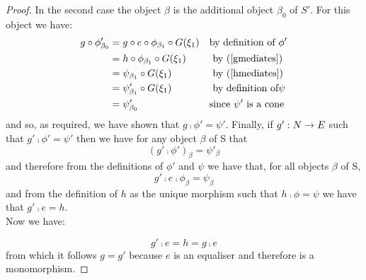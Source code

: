 \documentclass[10pt,a4paper]{scrartcl}
\begin{document}
\begin{proof}
\noindent
In the second case the object $\beta$ is the additional object $\beta_0$ of $S'$. For this object we have:
\begin{align*}
g \circ \phi'_{\beta_0}
   & = g \circ e \circ \phi_{\beta_1} \circ G(\xi_1)  && \mbox{by definition of }\phi' \\ 
             & = h \circ \phi_{\beta_1} \circ G(\xi_1) && \mbox{ by (\ref{gmediates})} \\
             & = \psi_{\beta_1}  \circ G(\xi_1)       && \mbox{ by (\ref{hmediates})} \\
						 & = \psi'_{\beta_1} \circ G(\xi_1)       && \mbox{ by definition of} \psi \\
						& = \psi'_{\beta_0}                        && \mbox{since }\psi' \mbox{ is a cone} \\ 
\end{align*}
and so, as required, we have shown that 
$g \comp \phi' = \psi'$.
\noindent Finally, if $g':N \rightarrow E$ such that $g' \comp \phi' = \psi'$ then we have 
for any object $\beta$ of S that
$$(g'\comp\phi')_\beta = \psi'_\beta$$
\noindent
and therefore from the definitions of $\phi'$ and $\psi$ we have
that, for all objects $\beta$ of S,
$$
g' \comp e \comp \phi_\beta = \psi_\beta
$$
\noindent
and  from the definition of $h$ as the unique morphism such that
$h \comp \phi = \psi$ we have that 
$g' \comp e = h$.\\

\noindent
Now we have:
 
$$g' \comp e = h = g \comp e$$
from which it follows $g=g'$ because $e$ is an equaliser and therefore is a monomorphism. 
\end{proof}
\fi


\end{document}
